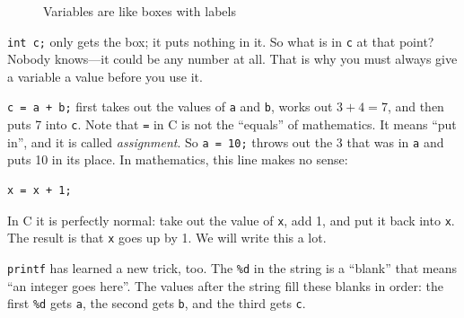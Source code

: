 \begin{figure}[htbp]
  \centering
  \caption{Variables are like boxes with labels}
  \label{fig:boxes}
\end{figure}

\texttt{int c;} only gets the box; it puts nothing in it. So what is in \texttt{c} at that point? Nobody knows---it could be any number at all. That is why you must always give a variable a value before you use it.

\texttt{c = a + b;} first takes out the values of \texttt{a} and \texttt{b}, works out $3 + 4 = 7$, and then puts 7 into \texttt{c}. Note that \texttt{=} in C is not the ``equals'' of mathematics. It means ``put in'', and it is called \emph{assignment}. So \texttt{a = 10;} throws out the 3 that was in \texttt{a} and puts 10 in its place. In mathematics, this line makes no sense:
\begin{verbatim}
x = x + 1;
\end{verbatim}
In C it is perfectly normal: take out the value of \texttt{x}, add 1, and put it back into \texttt{x}. The result is that \texttt{x} goes up by 1. We will write this a lot.

\texttt{printf} has learned a new trick, too. The \texttt{\%d} in the string is a ``blank'' that means ``an integer goes here''. The values after the string fill these blanks in order: the first \texttt{\%d} gets \texttt{a}, the second gets \texttt{b}, and the third gets \texttt{c}.

